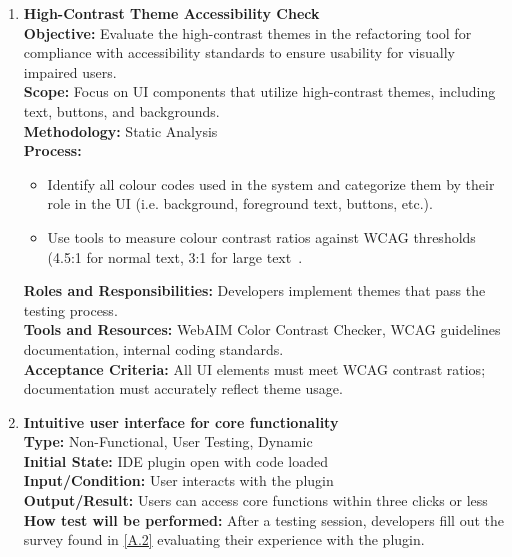 \documentclass[12pt, titlepage]{article}
\begin{document}
\begin{enumerate}[label={\bf \textcolor{Maroon}{test-UH-\arabic*}},
    wide=0pt, font=\itshape]
  \item \textbf{High-Contrast Theme Accessibility Check} \\[2mm]
    \textbf{Objective:} Evaluate the high-contrast themes in the
    refactoring tool for compliance with accessibility standards to
    ensure usability for visually impaired users. \\
    \textbf{Scope:} Focus on UI components that utilize high-contrast
    themes, including text, buttons, and backgrounds. \\
    \textbf{Methodology:} Static Analysis \\
    \textbf{Process:}
    \begin{itemize}
      \item Identify all colour codes used in the system and
        categorize them by their role in the UI (i.e. background,
        foreground text, buttons, etc.).
      \item Use tools to measure colour contrast ratios against WCAG
        thresholds (4.5:1 for normal text, 3:1 for large text~\cite{WCAG}.
      \end{itemize}
      \textbf{Roles and Responsibilities:} Developers implement
      themes that pass the testing process. \\[2mm]
      \textbf{Tools and Resources:} WebAIM Color Contrast Checker,
      WCAG guidelines documentation, internal coding standards. \\[2mm]
      \textbf{Acceptance Criteria:} All UI elements must meet WCAG
      contrast ratios; documentation must accurately reflect theme usage.

    \item \textbf{Intuitive user interface for core functionality} \\[2mm]
      \textbf{Type:} Non-Functional, User Testing, Dynamic \\
      \textbf{Initial State:} IDE plugin open with code loaded \\
      \textbf{Input/Condition:} User interacts with the plugin \\
      \textbf{Output/Result:} Users can access core functions within
      three clicks or less \\[2mm]
      \textbf{How test will be performed:} After a testing session,
      developers fill out the survey found in \ref{A.2} evaluating
      their experience with the plugin.


\end{enumerate}
\end{document}
